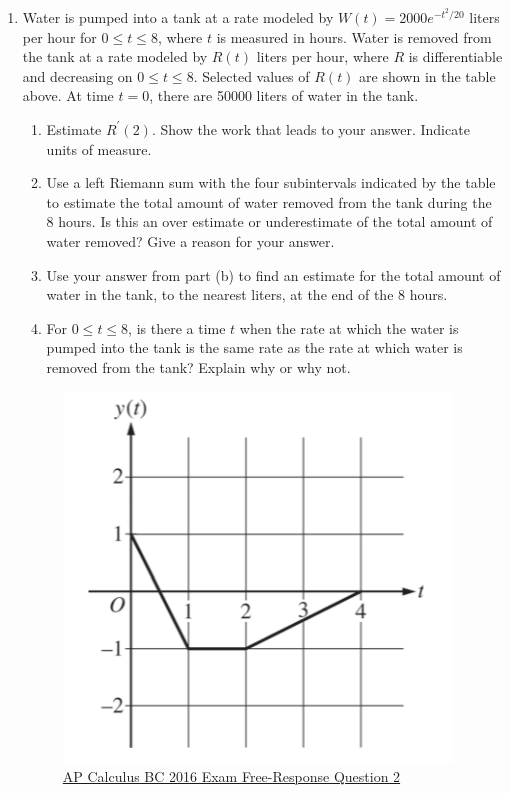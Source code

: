 \begin{enumerate}
	\item Water is pumped into a tank at a rate modeled by $W(t)=2000e^{-t^2/20}$ liters per hour for $0 \leq t \leq 8$, where $t$ is measured in hours.
	Water is removed from the tank at a rate modeled by $R(t)$ liters per hour, where $R$ is differentiable and decreasing on $0 \leq t \leq 8$.
	Selected values of $R(t)$ are shown in the table above.
	At time $t=0$, there are 50000 liters of water in the tank.
	\begin{enumerate}
		\item Estimate $R^\prime(2)$.
		Show the work that leads to your answer.
		Indicate units of measure.
		\item Use a left Riemann sum with the four subintervals indicated by the table to estimate the total amount of water removed from the tank during the 8 hours.
		Is this an over estimate or underestimate of the total amount of water removed?
		Give a reason for your answer.
		\item Use your answer from part (b) to find an estimate for the total amount of water in the tank, to the nearest liters, at the end of the 8 hours.
		\item For $0 \leq t \leq 8$, is there a time $t$ when the rate at which the water is pumped into the tank is the same rate as the rate at which water is removed from the tank?
		Explain why or why not.
	\end{enumerate}

	\begin{figure}[H]
		\label{2016_2}
		\centering
		\includegraphics{./additional_materials/2016_2.png}
		\caption{\hyperref{https://secure-media.collegeboard.org/digitalServices/pdf/ap/ap16\_frq\_calculus\_bc.pdf}{}{}{AP Calculus BC 2016 Exam Free-Response Question 2}}
	\end{figure}
	

\end{enumerate}
